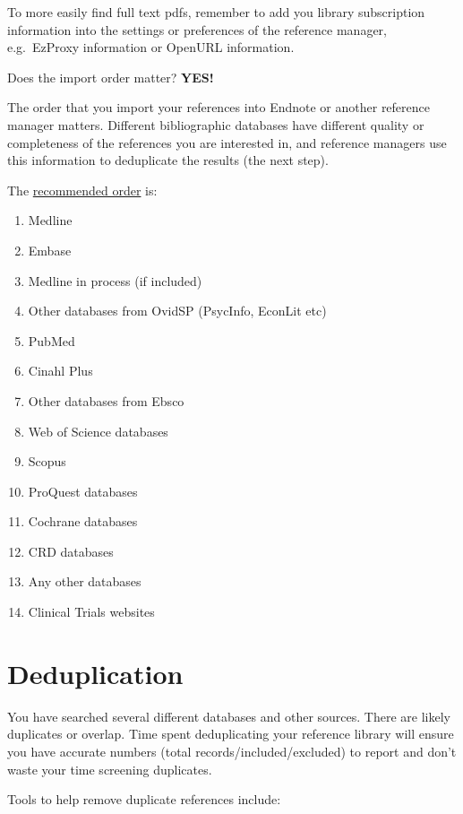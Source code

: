 \documentclass[
]{book}
\providecommand{\tightlist}{%
  \setlength{\itemsep}{0pt}\setlength{\parskip}{0pt}}
\begin{document}
To more easily find full text pdfs, remember to add you library subscription information into the settings or preferences of the reference manager, e.g.~EzProxy information or OpenURL information.

Does the import order matter? \textbf{YES!}

The order that you import your references into Endnote or another reference manager matters. Different bibliographic databases have different quality or completeness of the references you are interested in, and reference managers use this information to deduplicate the results (the next step).

The \href{https://blogs.lshtm.ac.uk/library/2018/12/07/removing-duplicates-from-an-endnote-library/}{recommended order} is:

\begin{enumerate}
\def\labelenumi{\arabic{enumi}.}
\tightlist
\item
  Medline
\item
  Embase
\item
  Medline in process (if included)
\item
  Other databases from OvidSP (PsycInfo, EconLit etc)
\item
  PubMed
\item
  Cinahl Plus
\item
  Other databases from Ebsco
\item
  Web of Science databases
\item
  Scopus
\item
  ProQuest databases
\item
  Cochrane databases
\item
  CRD databases
\item
  Any other databases
\item
  Clinical Trials websites
\end{enumerate}

\hypertarget{deduplication}{%
\section{Deduplication}\label{deduplication}}

You have searched several different databases and other sources. There are likely duplicates or overlap. Time spent deduplicating your reference library will ensure you have accurate numbers (total records/included/excluded) to report and don't waste your time screening duplicates.

Tools to help remove duplicate references include:
\end{document}
